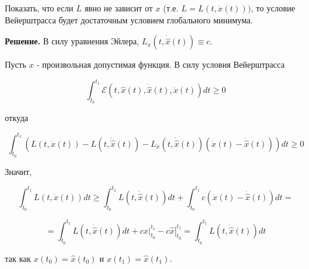 \begin{task}
    Показать, что если $L$ явно не зависит от $x$ (т.е. $L=L(t, \dot{x}(t)))$, то условие Вейерштрасса будет достаточным условием глобального минимума.

    \textbf{Решение.} В силу уравнения Эйлера, $L_{\dot{x}}(t, \dot{\hat{x}}(t)) \equiv c$.
    
    Пусть $x$ - произвольная допустимая функция. В силу условия Вейерштрасса
    
    $$
    \int_{t_{0}}^{t_{1}} \mathcal{E}(t, \hat{x}(t), \dot{\hat{x}}(t), \dot{x}(t)) d t \geq 0
    $$
    
    откуда
    
    $$
    \int_{t_{0}}^{t_{1}}\left(L(t, \dot{x}(t))-L(t, \dot{\hat{x}}(t))-L_{\dot{x}}(t, \dot{\hat{x}}(t))(\dot{x}(t)-\dot{\hat{x}}(t))\right) d t \geq 0
    $$
    
    Значит,
    
    $$
    \int_{t_{0}}^{t_{1}} L(t, \dot{x}(t)) d t \geq \int_{t_{0}}^{t_{1}} L(t, \dot{\hat{x}}(t)) d t+\int_{t_{0}}^{t_{1}} c(\dot{x}(t)-\dot{\hat{x}}(t)) d t=
    $$
    
    $$
    =\int_{t_{0}}^{t_{1}} L(t, \dot{\hat{x}}(t)) d t+\left.c x\right|_{t_{0}} ^{t_{1}}-\left.c \hat{x}\right|_{t_{0}} ^{t_{1}}=\int_{t_{0}}^{t_{1}} L(t, \dot{\hat{x}}(t)) d t
    $$
    
    так как $x\left(t_{0}\right)=\hat{x}\left(t_{0}\right)$ и $x\left(t_{1}\right)=\hat{x}\left(t_{1}\right)$.
    
\end{task}